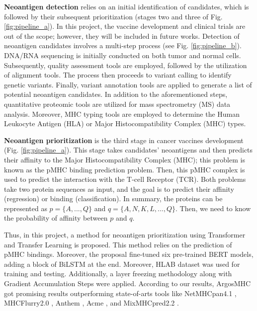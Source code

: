 \textbf{Neoantigen detection} relies on an initial identification of candidates, which is followed by their subsequent prioritization (stages two and three of Fig. \ref{fig:pipeline_a}). In this project, the vaccine development and clinical trials are out of the scope; however, they will be included in future works. Detection of neoantigen candidates involves a multi-step process (see Fig. \ref{fig:pipeline_b}). DNA/RNA sequencing is initially conducted on both tumor and normal cells. Subsequently, quality assessment tools are employed, followed by the utilization of alignment tools. The process then proceeds to variant calling to identify genetic variants. Finally, variant annotation tools are applied to generate a list of potential neoantigen candidates. In addition to the aforementioned steps, quantitative proteomic tools are utilized for mass spectrometry (MS) data analysis. Moreover, MHC typing tools are employed to determine the Human Leukocyte Antigen (HLA) or Major Histocompatibility Complex (MHC) types.

\textbf{Neoantigen prioritization} is the third stage in cancer vaccines development (Fig. \ref{fig:pipeline_a}). This stage takes candidates' neoantigens and then predicts their affinity to the Major Histocompatibility Complex (MHC); this problem is known as the pMHC binding prediction problem. Then,  this pMHC complex is used to predict the interaction with the T-cell Receptor (TCR). Both problems take two protein sequences as input, and the goal is to predict their affinity (regression) or binding (classification). In summary, the proteins can be represented as $p = \{ A, ... , Q \}$ and  $q = \{ A, N, K, L, ... ,Q \}$. Then, we need to know the probability of affinity between $p$ and $q$. 

Thus, in this project, a method for neoantigen prioritization using Transformer and Transfer Learning is proposed. This method relies on the prediction of pMHC bindings. Moreover, the proposal fine-tuned six pre-trained BERT models, adding a block of BiLSTM at the end. Moreover, HLAB dataset \cite{zhang2022hlab} was used for training and testing. Additionally, a layer freezing methodology along with Gradient Accumulation Steps were applied. According to our results, ArgosMHC got promising results outperforming state-of-arts tools like NetMHCpan4.1 \cite{reynisson2020netmhcpan}, MHCFlurry2.0 \cite{o2020mhcflurry}, Anthem \cite{mei2021anthem}, Acme \cite{hu2019acme}, and MixMHCpred2.2 \cite{gfeller2023improved}.
